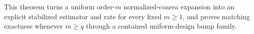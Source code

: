 This theorem turns a uniform order-\(m\) normalized-coarea expansion into an explicit stabilized estimator and rate for every fixed \(m\geq1\), and proves matching exactness whenever \(m\geq q\) through a contained uniform-design bump family.